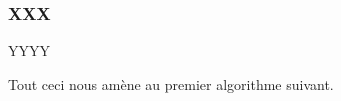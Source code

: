 \subsubsection{XXX} \label{algo-kill}

\leavevmode
\smallskip

YYYY







\newpage

Tout ceci nous amène au premier algorithme suivant.

{\small
\begin{algo}[frame] \label{algo-kill}
	\BlankLine
\end{algo}
}